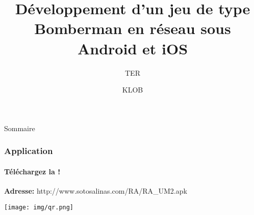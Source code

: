 \documentclass[11pt, sans]{beamer}
\title{Développement d'un jeu de type Bomberman en réseau sous Android et iOS}
\author{KLOB}
\institute{Université Montpellier II}
\subtitle{TER}
\begin{document}
\begin{frame}
\titlepage
\end{frame}


\begin{frame}{Sommaire}
\setcounter{tocdepth}{1}
\tableofcontents
\end{frame}

















\begin{frame}
\frametitle{Application}
\framesubtitle{Téléchargez la  !}
\begin{center}\textbf{Adresse:} http://www.sotosalinas.com/RA/RA\_UM2.apk\end{center}
\begin{center}\texttt{[image: img/qr.png]}\end{center}
\end{frame}
\end{document}
